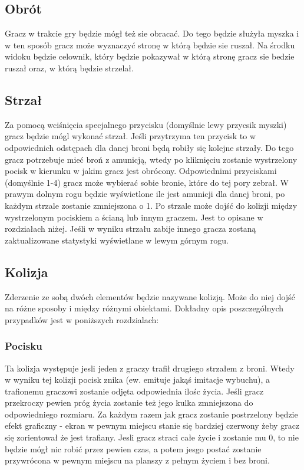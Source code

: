 \documentclass[12pt,a4paper,twoside]{article}
\begin{document}
\subsection{Obrót}
Gracz w trakcie gry będzie mógł też sie obracać. Do tego będzie służyła myszka i w ten sposób gracz może wyznaczyć stronę w którą będzie sie ruszał. Na środku widoku będzie celownik, który będzie pokazywał w którą stronę gracz sie bedzie ruszał oraz, w którą będzie strzelał.

\subsection{Strzał}
Za pomocą wciśnięcia specjalnego przycisku (domyślnie lewy przycsik myszki) gracz będzie mógl wykonać strzał. Jeśli przytrzyma ten przycisk to w odpowiednich odstępach dla danej broni będą robiły się kolejne strzały. Do tego gracz potrzebuje mieć broń z amunicją, wtedy po kliknięciu zostanie wystrzelony pocisk w kierunku w jakim gracz jest obrócony. Odpowiednimi przyciskami (domyślnie 1-4) gracz może wybierać sobie bronie, które do tej pory zebrał. W prawym dolnym rogu będzie wyświetlone ile jest amunicji dla danej broni, po każdym strzale zostanie zmniejszona o 1. Po strzale może dojść do kolizji między wystrzelonym pociskiem a ścianą lub innym graczem. Jest to opisane w rozdziałach niżej. Jeśli w wyniku strzału zabije innego gracza zostaną zaktualizowane statystyki wyświetlane w lewym górnym rogu.

\subsection{Kolizja}
Zderzenie ze sobą dwóch elementów będzie nazywane kolizją. Może do niej dojść na różne sposoby i między różnymi obiektami. Dokładny opis poszczególnych przypadków jest w poniższych rozdzialach:

\subsubsection{Pocisku}
Ta kolizja występuje jesli jeden z graczy trafił drugiego strzałem z broni. Wtedy w wyniku tej kolizji pocisk znika (ew. emituje jakąś imitacje wybuchu), a trafionemu graczowi zostanie odjęta odpowiednia ilośc życia. Jeśli gracz przekroczy pewien próg życia zostanie też jego kulka zmniejszona do odpowiedniego rozmiaru. Za każdym razem jak gracz zostanie postrzelony będzie efekt graficzny - ekran w pewnym miejscu stanie się bardziej czerwony żeby gracz się zorientował że jest trafiany. Jesli gracz straci całe życie i zostanie mu 0, to nie będzie mógł nic robić przez pewien czas, a potem jesgo postać zostanie przywrócona w pewnym miejscu na planszy z pełnym życiem i bez broni.
\end{document}
